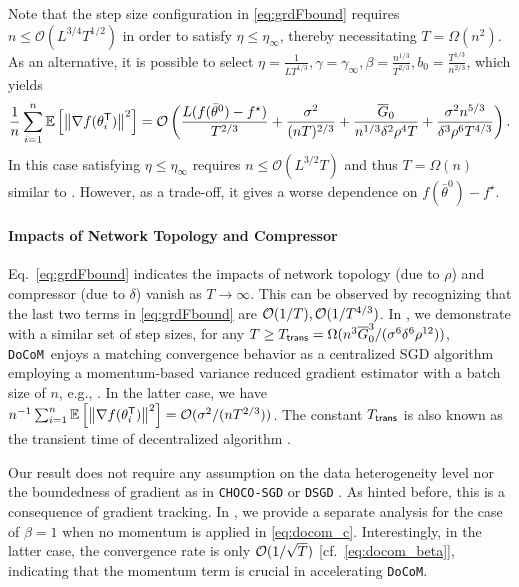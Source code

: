 \documentclass[10pt]{article} %
\newcommand{\revision}{}
\theoremstyle{plain}
\theoremstyle{definition}
\theoremstyle{remark}
\newcommand{\aname}{{\tt DoCoM}}
\newcommand{\prm}{\theta}
\newcommand{\avgtheta}{\bar{\prm}}
\newcommand{\norm}[1]{\left\| #1 \right\|}
\newcommand{\InitG}{\overline{G}_0}
\begin{document}
{\revision 
Note that the step size configuration in \eqref{eq:grdFbound} requires $n \leq \mathcal{O}(L^{3/4} T^{1/2})$ in order to satisfy $\eta \leq \eta_{\infty}$, thereby necessitating $T = \Omega(n^2)$. As an alternative, it is possible to select
$\eta = \frac{1}{L T^{1/3}}, \gamma = \gamma_\infty, \beta = \frac{n^{1/3}}{T^{2/3}}, b_0 = \frac{T^{1/3}}{n^{2/3}}$, which yields
\begin{equation}
\frac{1}{n} \sum_{i=1}^n \mathbb{E} \left[ \norm{ \nabla f( \theta_i^{\sf T} )}^2 \right] = {\cal O} \left( \frac{L (f(\avgtheta^0) - f^\star)}{T^{2/3}} + \frac{\sigma^2}{ (n T)^{2/3}} + \frac{\InitG}{n^{1/3} \delta^2 \rho^4 T} + \frac{\sigma^2 n^{5/3}}{ \delta^3 \rho^6 T^{4/3}} \right) . \label{eq:grdFbound_2} 
\end{equation}
In this case satisfying $\eta \leq \eta_{\infty}$ requires $n \leq \mathcal{O}(L^{3/2} T)$ and thus $T = \Omega(n)$ similar to \cite{koloskova2019decentralizeda}. However, as a trade-off, it gives a worse dependence on $f(\avgtheta^0) - f^\star$. 
}

\paragraph{Impacts of Network Topology and Compressor} Eq.~\eqref{eq:grdFbound} indicates the impacts of network topology (due to $\rho$) and compressor (due to $\delta$) vanish as $T \to \infty$. This can be observed by recognizing that the last two terms in \eqref{eq:grdFbound} are ${\cal O}(1/T), {\cal O}(1/T^{4/3})$. In , we demonstrate with a similar set of step sizes, for any 
$T \geq T_{\sf trans} = \Omega( n^3 \InitG^3 / ( \sigma^6 \delta^6 \rho^{12} ) )$, 
\aname~enjoys a matching convergence behavior as a centralized SGD algorithm employing a momentum-based variance reduced gradient estimator with a batch size of $n$, e.g., \citep{tran2021hybrid}. In the latter case, we have $n^{-1} \sum_{i=1}^n \mathbb{E} \left[ \norm{ \nabla f( \theta_i^{\sf T} )}^2 \right] = {\cal O}( \sigma^2 / (nT^{2/3} ))$. The constant $T_{\sf trans}$ is also known as the transient time of decentralized algorithm \citep{pu2020asymptotic}.

Our result does not require any assumption on the data heterogeneity level nor the boundedness of gradient as in {\tt CHOCO-SGD} \citep{koloskova2019decentralizeda} or {\tt DSGD} \citep{lian2017can}. As hinted before, this is a consequence of gradient tracking. 
In , we provide a separate analysis for the case of $\beta = 1$ when no momentum is applied in \eqref{eq:docom_c}. Interestingly, in the latter case, the convergence rate is only ${\cal O}(1/\sqrt{T})$ [cf.~\eqref{eq:docom_beta}], indicating that the momentum term is crucial in accelerating \aname.
\end{document}
